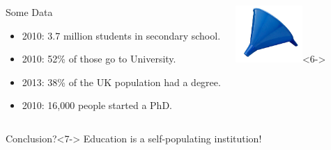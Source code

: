 \documentclass[10pt,handout]{beamer}
\begin{document}
\begin{frame}

\begin{columns}[c]
\begin{block}{Some Data}
\begin{itemize}
\item<2-> 2010: 3.7 million students in secondary school. %
\item<3-> 2010: 52\% of those go to University. %
\item<4-> 2013: 38\% of the UK population had a degree. %
\item<5-> 2010: 16,000 people started a PhD. %
\end{itemize}
\end{block}
\begin{center}
\includegraphics[width=1in]{Funnel.jpg}<6->
\end{center}
\end{columns}

\begin{block}{Conclusion?}<7->
Education is a self-populating institution!
\vspace{1em}
\begin{center}
\end{center}
\vspace{1em}

\end{block}

\end{frame}

\end{document}

